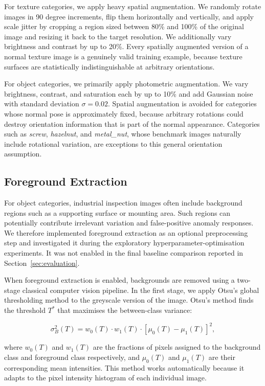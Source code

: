 \documentclass[11pt, a4paper]{article}
\begin{document}
For texture categories, we apply heavy spatial augmentation. We randomly rotate images in 90 degree increments, flip them horizontally and vertically, and apply scale jitter by cropping a region sized between 80\% and 100\% of the original image and resizing it back to the target resolution. We additionally vary brightness and contrast by up to 20\%. Every spatially augmented version of a normal texture image is a genuinely valid training example, because texture surfaces are statistically indistinguishable at arbitrary orientations.

For object categories, we primarily apply photometric augmentation. We vary
brightness, contrast, and saturation each by up to 10\% and add Gaussian noise
with standard deviation $\sigma = 0.02$. Spatial augmentation is avoided for
categories whose normal pose is approximately fixed, because arbitrary rotations
could destroy orientation information that is part of the normal appearance.
Categories such as \textit{screw}, \textit{hazelnut}, and \textit{metal\_nut},
whose benchmark images naturally include rotational variation, are exceptions
to this general orientation assumption.

\subsection{Foreground Extraction}
\label{sec:foreground}

For object categories, industrial inspection images often include background regions such as a supporting surface or mounting area. Such regions can potentially contribute irrelevant variation and false-positive anomaly responses. We therefore implemented foreground extraction as an optional preprocessing step and investigated it during the exploratory hyperparameter-optimisation experiments. It was not enabled in the final baseline comparison reported in Section~\ref{sec:evaluation}.

When foreground extraction is enabled, backgrounds are removed using a two-stage classical computer vision pipeline. In the first stage, we apply Otsu's global thresholding method \cite{otsu1979} to the greyscale version of the image. Otsu's method finds the threshold $T^*$ that maximises the between-class variance:

\[
\sigma_B^2(T) = w_0(T) \cdot w_1(T) \cdot \left[\mu_0(T) - \mu_1(T)\right]^2,
\]

where $w_0(T)$ and $w_1(T)$ are the fractions of pixels assigned to the background class and foreground class respectively, and $\mu_0(T)$ and $\mu_1(T)$ are their corresponding mean intensities. This method works automatically because it adapts to the pixel intensity histogram of each individual image.
\end{document}
